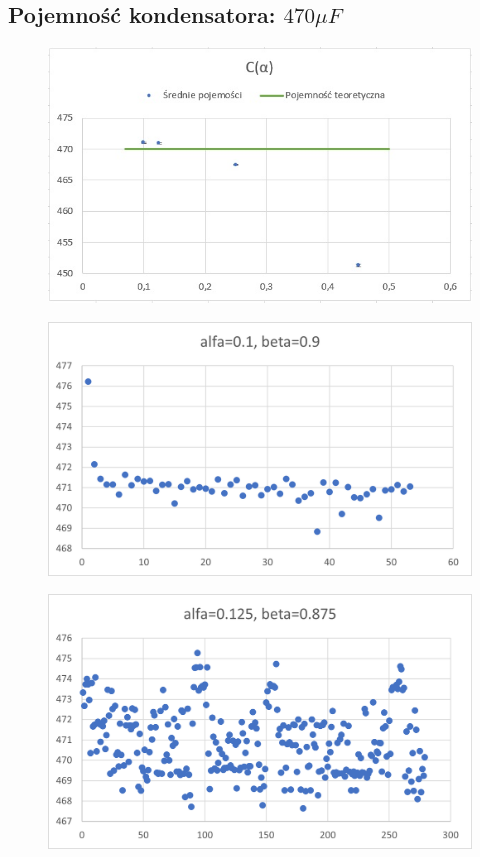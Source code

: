 \documentclass[12pt]{mwart}
\begin{document}
	\subsection{Pojemność kondensatora: $470 \mu F$}
	\begin{figure}[H]
		\centering
		\includegraphics{data/470_sr.jpg}
	\end{figure}
	\begin{figure}[H]
		\centering
		\includegraphics{data/470_a0.1.png}
	\end{figure}
	\begin{figure}[H]
		\centering
		\includegraphics{data/470_a0.125.png}
	\end{figure}
\end{document}
